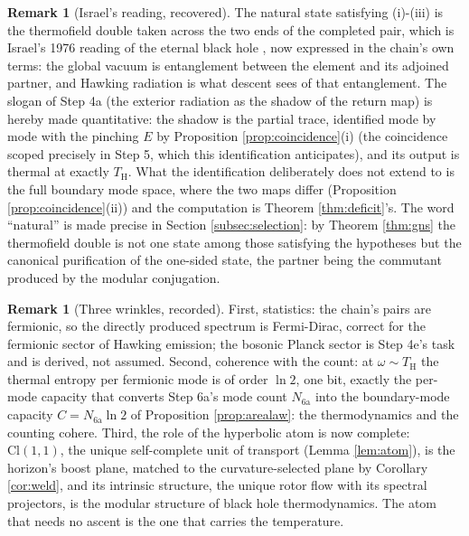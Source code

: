 \documentclass[11pt]{article}
\theoremstyle{definition}
\newtheorem{remark}[theorem]{Remark}
\newcommand{\Cl}{\mathrm{Cl}}
\renewcommand{\TH}{T_{\mathrm{H}}} %
\begin{document}
\begin{remark}[Israel's reading, recovered]\label{rem:israel}
The natural state satisfying (i)-(iii) is the thermofield double taken across the two ends of the completed pair, which is Israel's 1976 reading of the eternal black hole \cite{Israel1976}, now expressed in the chain's own terms: the global vacuum is entanglement between the element and its adjoined partner, and Hawking radiation is what descent sees of that entanglement. The slogan of Step 4a (the exterior radiation as the shadow of the return map) is hereby made quantitative: the shadow is the partial trace, identified mode by mode with the pinching $E$ by Proposition \ref{prop:coincidence}(i) (the coincidence scoped precisely in Step 5, which this identification anticipates), and its output is thermal at exactly $\TH$. What the identification deliberately does not extend to is the full boundary mode space, where the two maps differ (Proposition \ref{prop:coincidence}(ii)) and the computation is Theorem \ref{thm:deficit}'s. The word ``natural'' is made precise in Section \ref{subsec:selection}: by Theorem \ref{thm:gns} the thermofield double is not one state among those satisfying the hypotheses but the canonical purification of the one-sided state, the partner being the commutant produced by the modular conjugation.
\end{remark}

\begin{remark}[Three wrinkles, recorded]\label{rem:wrinkles}
First, statistics: the chain's pairs are fermionic, so the directly produced spectrum is Fermi-Dirac, correct for the fermionic sector of Hawking emission; the bosonic Planck sector is Step 4e's task and is derived, not assumed. Second, coherence with the count: at $\omega \sim \TH$ the thermal entropy per fermionic mode is of order $\ln 2$, one bit, exactly the per-mode capacity that converts Step 6a's mode count $N_{\mathrm{6a}}$ into the boundary-mode capacity $C = N_{\mathrm{6a}}\ln 2$ of Proposition \ref{prop:arealaw}: the thermodynamics and the counting cohere. Third, the role of the hyperbolic atom is now complete: $\Cl(1,1)$, the unique self-complete unit of transport (Lemma \ref{lem:atom}), is the horizon's boost plane, matched to the curvature-selected plane by Corollary \ref{cor:weld}, and its intrinsic structure, the unique rotor flow with its spectral projectors, is the modular structure of black hole thermodynamics. The atom that needs no ascent is the one that carries the temperature.
\end{remark}
\end{document}

